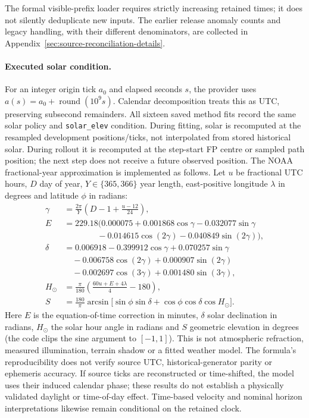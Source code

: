 \documentclass[11pt]{article}
\begin{document}
The formal visible-prefix loader requires strictly increasing retained
times; it does not silently deduplicate new inputs. The earlier release
anomaly counts and legacy handling, with their different denominators, are
collected in Appendix~\ref{sec:source-reconciliation-details}.

\paragraph{Executed solar condition.}
For an integer origin tick \(a_0\) and elapsed seconds \(s\), the provider uses
\(a(s)=a_0+\operatorname{round}(10^9s)\). Calendar decomposition treats this as
UTC, preserving subsecond remainders. All sixteen saved method fits record
the same solar policy and \texttt{solar\_elev} condition. During fitting,
solar is recomputed at the resampled development positions/ticks, not
interpolated from stored historical solar. During rollout it is recomputed
at the step-start FP centre or sampled path position; the next step does not
receive a future observed position. The NOAA fractional-year approximation
is implemented as follows\cite{noaa}. Let \(u\) be fractional UTC hours,
\(D\) day of year, \(Y\in\{365,366\}\) year length, east-positive longitude
\(\lambda\) in degrees and latitude \(\phi\) in radians:
\begin{align}
\gamma&=\frac{2\pi}{Y}\left(D-1+\frac{u-12}{24}\right),\nonumber\\
E&=229.18\bigl(0.000075+0.001868\cos\gamma-0.032077\sin\gamma\nonumber\\
 &\hspace{4em}-0.014615\cos(2\gamma)-0.040849\sin(2\gamma)\bigr),\nonumber\\
\delta&=0.006918-0.399912\cos\gamma+0.070257\sin\gamma\nonumber\\
 &\quad-0.006758\cos(2\gamma)+0.000907\sin(2\gamma)\nonumber\\
 &\quad-0.002697\cos(3\gamma)+0.001480\sin(3\gamma),\nonumber\\
H_\odot&=\frac{\pi}{180}\left(\frac{60u+E+4\lambda}{4}-180\right),\nonumber\\
S&=\frac{180}{\pi}\arcsin\bigl[\sin\phi\sin\delta+
          \cos\phi\cos\delta\cos H_\odot\bigr].
\label{eq:solar-condition}
\end{align}
Here \(E\) is the equation-of-time correction in minutes, \(\delta\) solar
declination in radians, \(H_\odot\) the solar hour angle in radians and
\(S\) geometric elevation in degrees (the code clips the sine argument to
\([-1,1]\)). This is not atmospheric refraction, measured illumination,
terrain shadow or a fitted weather model. The formula's reproducibility
does not verify source UTC, historical-generator parity or ephemeris
accuracy. If source ticks are reconstructed or time-shifted, the model uses
their induced calendar phase; these results do not establish a physically
validated daylight or time-of-day effect. Time-based velocity and nominal
horizon interpretations likewise remain conditional on the retained clock.
\end{document}
